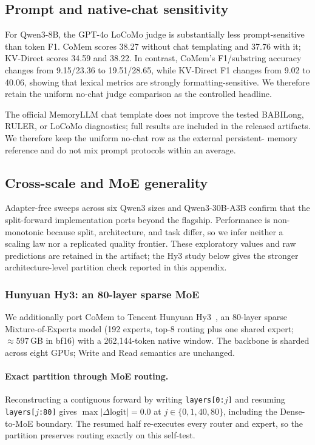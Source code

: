 \subsection{Prompt and native-chat sensitivity}

For Qwen3-8B, the GPT-4o LoCoMo judge is substantially less prompt-sensitive
than token F1. CoMem scores 38.27 without chat templating and 37.76 with it;
KV-Direct scores 34.59 and 38.22. In contrast, CoMem's F1/substring accuracy
changes from 9.15/23.36 to 19.51/28.65, while KV-Direct F1 changes from 9.02 to
40.06, showing that lexical metrics are strongly formatting-sensitive. We therefore retain the uniform
no-chat judge comparison as the controlled headline.

The official MemoryLLM chat template does not improve the tested BABILong,
RULER, or LoCoMo diagnostics; full results are included in the released
artifacts. We therefore keep the uniform no-chat row as the external persistent-
memory reference and do not mix prompt protocols within an average.

\subsection{Cross-scale and MoE generality}
\label{app:generality}
Adapter-free sweeps across six Qwen3 sizes and Qwen3-30B-A3B confirm that the
split-forward implementation ports beyond the flagship. Performance is
non-monotonic because split, architecture, and task differ, so we infer neither
a scaling law nor a replicated quality frontier. These exploratory values and
raw predictions are retained in the artifact; the Hy3 study below gives the
stronger architecture-level partition check reported in this appendix.

\subsubsection{Hunyuan Hy3: an 80-layer sparse MoE}
\label{sec:hy3-general}
We additionally port CoMem to Tencent Hunyuan Hy3~\citep{hunyuan}, an 80-layer sparse
Mixture-of-Experts model (192 experts, top-8 routing plus one shared expert;
$\approx597$\,GB in bf16) with a 262,144-token native window. The backbone is
sharded across eight GPUs; Write and Read semantics are unchanged.

\paragraph{Exact partition through MoE routing.}
Reconstructing a contiguous forward by writing \texttt{layers[0:$j$]} and
resuming \texttt{layers[$j$:80]} gives
$\max|\Delta\mathrm{logit}|=0.0$ at $j\in\{0,1,40,80\}$, including the
Dense-to-MoE boundary. The resumed half re-executes every router and expert, so
the partition preserves routing exactly on this self-test.

